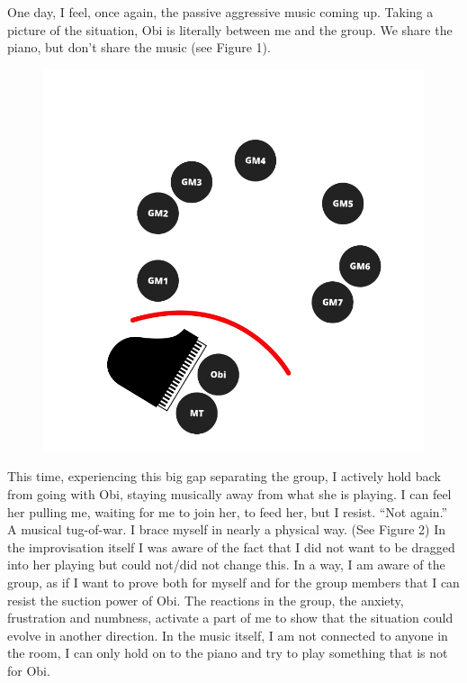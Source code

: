 \documentclass[authordate, empirical]{jote-new-article}
\begin{document}
One day, I feel, once again, the passive aggressive music coming up. Taking a picture of the situation, Obi is literally between me and the group. We share the piano, but don't share the music (see Figure 1).



\begin{figure}

  \includegraphics[width=\linewidth]{media/image1.png}

  \caption{}

  \label{fig:rId5}


\end{figure}



This time, experiencing this big gap separating the group, I actively hold back from going with Obi, staying musically away from what she is playing. I can feel her pulling me, waiting for me to join her, to feed her, but I resist. “Not again.” A musical tug-of-war. I brace myself in nearly a physical way. (See Figure 2) In the improvisation itself I was aware of the fact that I did not want to be dragged into her playing but could not/did not change this. In a way, I am aware of the group, as if I want to prove both for myself and for the group members that I can resist the suction power of Obi. The reactions in the group, the anxiety, frustration and numbness, activate a part of me to show that the situation could evolve in another direction. In the music itself, I am not connected to anyone in the room, I can only hold on to the piano and try to play something that is not for Obi.
\end{document}
